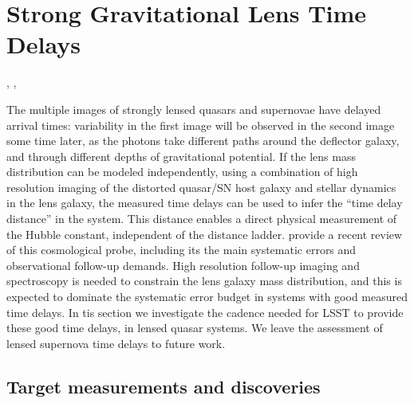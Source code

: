 %
%
%

\section{ Strong Gravitational Lens Time Delays }
\def\secname{lenstimedelays}\label{sec:\secname}

,
,

The multiple images of strongly lensed quasars and supernovae have
delayed arrival times: variability in the first image will be observed
in the second image some time later, as the photons take different
paths around the deflector galaxy, and through different depths of
gravitational potential. If the lens mass distribution can be modeled
independently, using a combination of high resolution imaging of the
distorted quasar/SN host galaxy and stellar dynamics in the lens
galaxy, the measured time delays can be used to infer the ``time delay
distance'' in the system. This distance enables a direct physical measurement
of the Hubble constant, independent of the distance ladder.  \citet{TM16} provide a recent review of this cosmological probe, including its the main systematic errors and observational follow-up demands. High resolution follow-up imaging and spectroscopy is needed to constrain the lens galaxy mass distribution, and this is expected to dominate the systematic error budget in systems with good measured time delays. In tis section we investigate the cadence needed for LSST to provide these good time delays, in lensed quasar systems. We leave the assessment of lensed supernova time delays to future work.


\subsection{Target measurements and discoveries}
\label{sec:\secname:targets}

